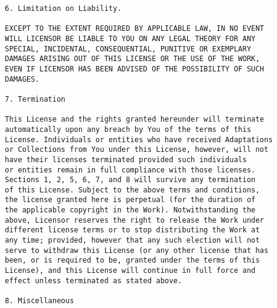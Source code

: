 \begin{verbatim}
6. Limitation on Liability.

EXCEPT TO THE EXTENT REQUIRED BY APPLICABLE LAW, IN NO EVENT
WILL LICENSOR BE LIABLE TO YOU ON ANY LEGAL THEORY FOR ANY
SPECIAL, INCIDENTAL, CONSEQUENTIAL, PUNITIVE OR EXEMPLARY
DAMAGES ARISING OUT OF THIS LICENSE OR THE USE OF THE WORK,
EVEN IF LICENSOR HAS BEEN ADVISED OF THE POSSIBILITY OF SUCH
DAMAGES.

7. Termination

This License and the rights granted hereunder will terminate
automatically upon any breach by You of the terms of this
License. Individuals or entities who have received Adaptations
or Collections from You under this License, however, will not
have their licenses terminated provided such individuals
or entities remain in full compliance with those licenses.
Sections 1, 2, 5, 6, 7, and 8 will survive any termination
of this License. Subject to the above terms and conditions,
the license granted here is perpetual (for the duration of
the applicable copyright in the Work). Notwithstanding the
above, Licensor reserves the right to release the Work under
different license terms or to stop distributing the Work at
any time; provided, however that any such election will not
serve to withdraw this License (or any other license that has
been, or is required to be, granted under the terms of this
License), and this License will continue in full force and
effect unless terminated as stated above.

8. Miscellaneous


\end{verbatim}
